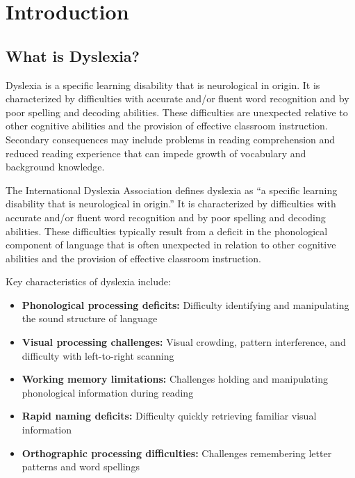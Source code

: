 \documentclass[journal]{IEEEtran}
\begin{document}
\section{Introduction}

\subsection{What is Dyslexia?}

Dyslexia is a specific learning disability that is neurological in origin. It is characterized by difficulties with accurate and/or fluent word recognition and by poor spelling and decoding abilities. These difficulties are unexpected relative to other cognitive abilities and the provision of effective classroom instruction. Secondary consequences may include problems in reading comprehension and reduced reading experience that can impede growth of vocabulary and background knowledge.

The International Dyslexia Association defines dyslexia as ``a specific learning disability that is neurological in origin.'' It is characterized by difficulties with accurate and/or fluent word recognition and by poor spelling and decoding abilities. These difficulties typically result from a deficit in the phonological component of language that is often unexpected in relation to other cognitive abilities and the provision of effective classroom instruction.

Key characteristics of dyslexia include:
\begin{itemize}
    \item \textbf{Phonological processing deficits:} Difficulty identifying and manipulating the sound structure of language
    \item \textbf{Visual processing challenges:} Visual crowding, pattern interference, and difficulty with left-to-right scanning
    \item \textbf{Working memory limitations:} Challenges holding and manipulating phonological information during reading
    \item \textbf{Rapid naming deficits:} Difficulty quickly retrieving familiar visual information
    \item \textbf{Orthographic processing difficulties:} Challenges remembering letter patterns and word spellings
\end{itemize}
\end{document}
